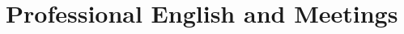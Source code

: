 \documentclass[
    12pt,
    a4paper,
    oneside,
    openany
]{book}
\begin{document}



\part{Professional English and Meetings}

\end{document}
